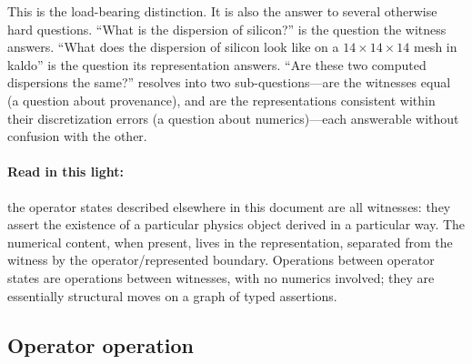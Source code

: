 \documentclass[11pt,a4paper]{article}
\begin{document}
This is the load-bearing distinction. It is also the answer to several otherwise hard questions.
``What is the dispersion of silicon?'' is the question the witness answers. ``What does the
dispersion of silicon look like on a $14\times14\times14$ mesh in kaldo'' is the question its
representation answers. ``Are these two computed dispersions the same?'' resolves into two
sub-questions---are the witnesses equal (a question about provenance), and are the
representations consistent within their discretization errors (a question about numerics)---each
answerable without confusion with the other.

\paragraph{Read in this light:}
the operator states described elsewhere in this document are all witnesses: they assert the
existence of a particular physics object derived in a particular way. The numerical content,
when present, lives in the representation, separated from the witness by the operator/represented
boundary. Operations between operator states are operations between witnesses, with no numerics
involved; they are essentially structural moves on a graph of typed assertions.


\subsection{Operator operation}
\end{document}
